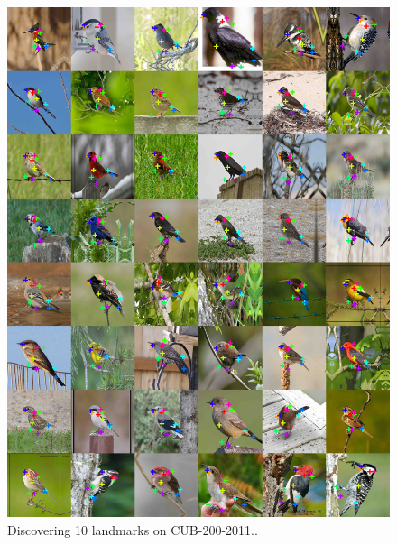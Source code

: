 \begin{figure}[t]
	\centering
	\includegraphics[trim={0cm 0cm 0cm 0cm},clip, width=1.\linewidth]{fig/supp/select48birds}
	\caption{Discovering 10 landmarks on CUB-200-2011..}
	\label{fig:kp_birds}
\end{figure}

